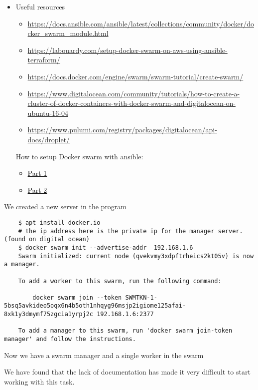 \begin{itemize}
    \item Useful resources
    \begin{itemize}
        \item \url{https://docs.ansible.com/ansible/latest/collections/community/docker/docker_swarm_module.html}
        \item \url{https://labouardy.com/setup-docker-swarm-on-aws-using-ansible-terraform/}
        \item \url{https://docs.docker.com/engine/swarm/swarm-tutorial/create-swarm/}
        \item \url{https://www.digitalocean.com/community/tutorials/how-to-create-a-cluster-of-docker-containers-with-docker-swarm-and-digitalocean-on-ubuntu-16-04}
        \item \url{https://www.pulumi.com/registry/packages/digitalocean/api-docs/droplet/}
    \end{itemize}

    How to setup Docker swarm with ansible:

    \begin{itemize}
        \item \href{https://www.youtube.com/watch?v=xZx9XoBnAUI}{Part 1}
        \item \href{https://www.youtube.com/watch?v=qVGO5_bKmpE\&list=PLWZKNB9waqIXEL-NIapWwIADPtkspe9vk\&index=47\&t=201s}{Part 2}
    \end{itemize}
\end{itemize}

We created a new server in the program
\begin{verbatim}
    $ apt install docker.io
    # the ip address here is the private ip for the manager server. (found on digital ocean)
    $ docker swarm init --advertise-addr  192.168.1.6
    Swarm initialized: current node (qvekvmy3xdpftrheics2kt05v) is now a manager.

    To add a worker to this swarm, run the following command:

        docker swarm join --token SWMTKN-1-5bsq5avkideo5oqx6n4b5oth1nhqyg96msjp2igiome125afai-8xk1y3dmymf75zgcia1yrpj2c 192.168.1.6:2377

    To add a manager to this swarm, run 'docker swarm join-token manager' and follow the instructions.
\end{verbatim}

Now we have a swarm manager and a single worker in the swarm

We have found that the lack of documentation has made it very difficult to start working with this task.

